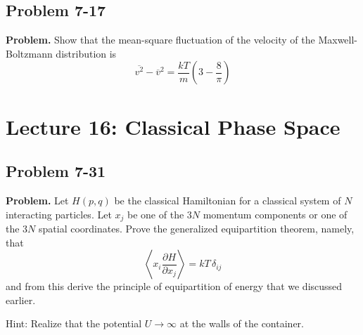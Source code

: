 \documentclass[twocolumn, 10pt]{article}
\numberwithin{equation}{section}
\newenvironment{problem}
{\par\medskip\sffamily \color{problue}
  \textbf{Problem. }\ignorespaces}
{\medskip}
\begin{document}
\subsection{Problem 7-17}

\begin{problem}
  Show that the mean-square fluctuation of
  the velocity of the Maxwell-Boltzmann distribution
  is
  $$
  \overline{ v^2 } - \overline{v}^2
  =
  \frac{ k T } { m }
  \left(3 - \frac{8}{\pi} \right)
  $$
\end{problem}

\section{Lecture 16: Classical Phase Space}

\subsection{Problem 7-31}

\begin{problem}
  Let $H(p, q)$ be the classical Hamiltonian
  for a classical system of $N$ interacting particles.
  Let $x_j$ be one of the $3N$ momentum components
  or one of the $3N$ spatial coordinates.
  Prove the generalized equipartition theorem, namely, that
  $$
  \left\langle
    x_i \frac{ \partial H } { \partial x_j }
  \right\rangle
  = kT \, \delta_{ij}
  $$
  and from this derive the principle
  of equipartition of energy that we discussed earlier.

  Hint: Realize that the potential $U \to \infty$
  at the walls of the container.
\end{problem}
\end{document}

